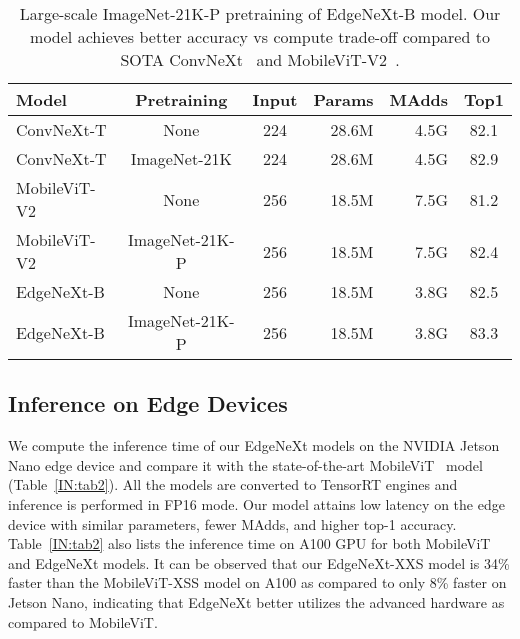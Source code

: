 \documentclass[runningheads]{llncs}
\renewcommand\arraystretch{1.0}
\begin{document}
\begin{table*}[!t]
\setlength{\tabcolsep}{4pt}
\renewcommand\arraystretch{1.0}
\caption{Large-scale ImageNet-21K-P pretraining of EdgeNeXt-B model. Our model achieves better accuracy vs compute trade-off compared to SOTA ConvNeXt~\cite{ConvNeXt} and MobileViT-V2~\cite{mehta2022separable}.}
\begin{center}
\begin{tabular}{l c c r r c}
\toprule
\rowcolor{Gray}    Model & Pretraining  & Input &  Params  & MAdds &   Top1  \\
\midrule
ConvNeXt-T & None & 224 & 28.6M & 4.5G & 82.1 \\
ConvNeXt-T & ImageNet-21K & 224 & 28.6M & 4.5G & 82.9 \\
\midrule
MobileViT-V2 & None & 256 & 18.5M & 7.5G & 81.2 \\
MobileViT-V2 & ImageNet-21K-P & 256 & 18.5M & 7.5G & 82.4 \\
\midrule
\rowcolor{orange!6} EdgeNeXt-B & None & 256 & 18.5M & 3.8G & 82.5 \\
\rowcolor{orange!6} EdgeNeXt-B & ImageNet-21K-P & 256 & 18.5M & 3.8G & 83.3 \\
\bottomrule 
\end{tabular}
\label{IN21K}
\end{center}
\end{table*}


\subsection{Inference on Edge Devices}
We compute the inference time of our EdgeNeXt models on the NVIDIA Jetson Nano edge device and compare it with the state-of-the-art MobileViT~\cite{MobileViT} model (Table~\ref{IN:tab2}). All the models are converted to TensorRT engines and inference is performed in FP16 mode. Our model attains low latency on the edge device with similar parameters, fewer MAdds, and higher top-1 accuracy. Table~\ref{IN:tab2} also lists the inference time on A100 GPU for both MobileViT and EdgeNeXt models. It can be observed that our EdgeNeXt-XXS model is 34\% faster than the MobileViT-XSS model on A100 as compared to only 8\% faster on Jetson Nano, indicating that EdgeNeXt better utilizes the advanced hardware as compared to MobileViT. 
\end{document}
